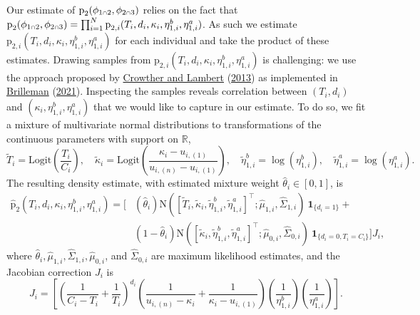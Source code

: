 \documentclass[
  10pt,
  a4paper,
]{article}
\let\Oldcap\cap
\renewcommand{\cap}{\mathrel{\mathsmaller{\Oldcap}}}
\newcommand{\pd}{\text{p}}
\begin{document}
Our estimate of \(\pd_{2}(\phi_{1 \cap 2}, \phi_{2 \cap 3})\) relies on
the fact that
\(\pd_{2}(\phi_{1 \cap 2}, \phi_{2 \cap 3}) = \prod_{i = 1}^{N}\pd_{2, i}(T_{i}, d_{i}, \kappa_{i}, \eta^{b}_{1, i}, \eta^{a}_{1, i})\).
As such we estimate
\(\pd_{2, i}(T_{i}, d_{i}, \kappa_{i}, \eta^{b}_{1, i}, \eta^{a}_{1, i})\)
for each individual and take the product of these estimates. Drawing
samples from
\(\pd_{2, i}(T_{i}, d_{i}, \kappa_{i}, \eta^{b}_{1, i}, \eta^{a}_{1, i})\)
is challenging: we use the approach proposed by
\protect\hyperlink{ref-crowther_simulating_2013}{Crowther and Lambert}
(\protect\hyperlink{ref-crowther_simulating_2013}{2013}) as implemented
in \protect\hyperlink{ref-brilleman_simsurv_2021}{Brilleman}
(\protect\hyperlink{ref-brilleman_simsurv_2021}{2021}). Inspecting the
samples reveals correlation between \((T_{i}, d_{i})\) and
\((\kappa_{i}, \eta^{b}_{1, i}, \eta^{a}_{1, i})\) that we would like to
capture in our estimate. To do so, we fit a mixture of multivariate
normal distributions to transformations of the continuous parameters
with support on \(\mathbb{R}\), \begin{equation}
  \tilde{T}_{i} = \text{Logit}\left(\frac{T_{i}}{C_{i}}\right), \quad
  \tilde{\kappa}_{i} = \text{Logit}\left(\frac{\kappa_{i} - u_{i, (1)}}{u_{i, (n)} - u_{i, (1)}}\right), \quad
  \tilde{\eta}^{b}_{1, i} = \log(\eta^{b}_{1, i}), \quad
  \tilde{\eta}^{a}_{1, i} = \log(\eta^{a}_{1, i}).
\end{equation} The resulting density estimate, with estimated mixture
weight \(\widehat{\theta}_{i} \in [0, 1]\), is \begin{align*}
  \widehat{\pd}_{2}(T_{i}, d_{i}, \kappa_{i}, \eta^{b}_{1, i}, \eta^{a}_{1, i}) =
    \Big[&(\widehat{\theta}_{i})
    \text{N}\left(\left[\tilde{T}_{i}, \tilde{\kappa}_{i}, \tilde{\eta}^{b}_{1, i}, \tilde{\eta}^{a}_{1, i} \right]^{\top}; \widehat{\mu}_{1, i}, \widehat{\Sigma}_{1, i} \right) \
    \boldsymbol{1}_{\{d_{i} = 1\}}
    + \\
    &(1 - \widehat{\theta}_{i})
    \text{N}\left(\left[\tilde{\kappa}_{i}, \tilde{\eta}^{b}_{1, i}, \tilde{\eta}^{a}_{1, i} \right]^{\top}; \widehat{\mu}_{0, i}, \widehat{\Sigma}_{0, i} \right) \
    \boldsymbol{1}_{\{d_{i} = 0, T_{i} = C_{i}\}} \Big]
    J_{i},
\end{align*} where
\(\widehat{\theta}_{i}, \widehat{\mu}_{1, i}, \widehat{\Sigma}_{1, i}, \widehat{\mu}_{0, i}\),
and \(\widehat{\Sigma}_{0, i}\) are maximum likelihood estimates, and
the Jacobian correction \(J_{i}\) is \begin{equation}
  J_{i} = \left[
    \left(
      \frac{1}{C_{i} - T_{i}} +
      \frac{1}{T_{i}}
    \right)^{d_{i}}
    \left(
      \frac{1}{u_{i, (n)} - \kappa_{i}} +
      \frac{1}{\kappa_{i} - u_{i, (1)}}
    \right)
    \left(
      \frac{1}{\eta^{b}_{1, i}}
    \right)
    \left(
      \frac{1}{\eta^{a}_{1, i}}
    \right)
  \right].
\end{equation}
\end{document}
